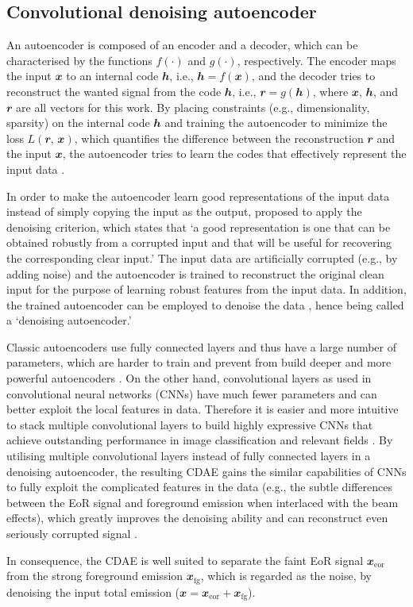 \documentclass[fleqn,usenatbib]{mnras}
\newcommand{\R}[1]{\mathrm{#1}}
\newcommand{\B}[1]{\mathbfit{#1}}
\newcommand{\editwip}[1]{{\leavevmode\color{magenta}#1}}
\begin{document}
\subsection{Convolutional denoising autoencoder}
\label{sec:cdae}

An autoencoder is composed of an encoder and a decoder, which can be
characterised by the functions $f(\cdot)$ and $g(\cdot)$, respectively.
The encoder maps the input $\B{x}$ to an internal code $\B{h}$, i.e.,
$\B{h} = f(\B{x})$, and the decoder tries to reconstruct the wanted
signal from the code $\B{h}$, i.e., $\B{r} = g(\B{h})$, where $\B{x}$,
$\B{h}$, and $\B{r}$ are all vectors for this work.
By placing constraints (e.g., dimensionality, sparsity) on the
internal code $\B{h}$ and training the autoencoder to minimize the
loss $L(\B{r}, \, \B{x})$, which quantifies the difference between the
reconstruction $\B{r}$ and the input $\B{x}$, the autoencoder tries to
learn the codes that effectively represent the input data
\citep[e.g.,][chapter 14]{goodfellow2016}.

\editwip{%
In order to make the autoencoder learn good representations of the input
data instead of simply copying the input as the output,
\citet{vincent2008,vincent2010} proposed to apply the denoising criterion,
which states that `a good representation is one that can be obtained
robustly from a corrupted input and that will be useful for recovering the
corresponding clear input.'
The input data are artificially corrupted (e.g., by adding noise) and the
autoencoder is trained to reconstruct the original clean input for the
purpose of learning robust features from the input data.
In addition, the trained autoencoder can be employed to denoise the data
\citep[e.g.,][]{xie2012,gondara2016}, hence being called a `denoising
autoencoder.'

Classic autoencoders use fully connected layers and thus have a large
number of parameters, which are harder to train and prevent from build
deeper and more powerful autoencoders
\citep[e.g.,][]{glorot2010,larochelle2009}.
On the other hand, convolutional layers as used in convolutional neural
networks (CNNs) have much fewer parameters and can better exploit the local
features in data.  Therefore it is easier and more intuitive to stack
multiple convolutional layers to build highly expressive CNNs that achieve
outstanding performance in image classification and relevant fields
\citep[e.g.,][]{krizhevsky2012,simonyan2014,szegedy2015}.
By utilising multiple convolutional layers instead of fully connected
layers in a denoising autoencoder, the resulting CDAE gains the similar
capabilities of CNNs to fully exploit the complicated features in the data
(e.g., the subtle differences between the EoR signal and foreground
emission when interlaced with the beam effects), which greatly improves
the denoising ability and can reconstruct even seriously corrupted signal
\citep{du2017}.}  %
In consequence, the CDAE is well suited to separate the faint EoR signal
$\B{x}_{\R{eor}}$ from the strong foreground emission $\B{x}_{\R{fg}}$,
which is regarded as the noise, by denoising the input total emission
($\B{x} = \B{x}_{\R{eor}} + \B{x}_{\R{fg}}$).
\end{document}
